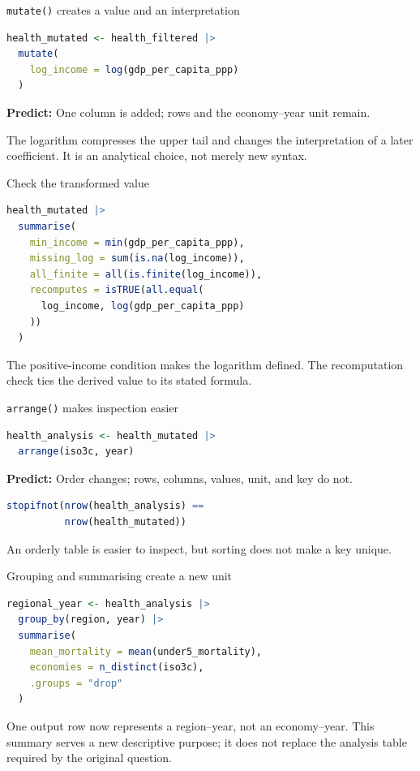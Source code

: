 \begin{frame}[fragile]{\texttt{mutate()} creates a value and an interpretation}
\begin{lstlisting}[language=R]
health_mutated <- health_filtered |>
  mutate(
    log_income = log(gdp_per_capita_ppp)
  )
\end{lstlisting}

  \textbf{Predict:} One column is added; rows and the economy--year unit remain.

  \vspace{0.5em}
  The logarithm compresses the upper tail and changes the interpretation of a
  later coefficient. It is an analytical choice, not merely new syntax.
\end{frame}

\begin{frame}[fragile]{Check the transformed value}
\begin{lstlisting}[language=R]
health_mutated |>
  summarise(
    min_income = min(gdp_per_capita_ppp),
    missing_log = sum(is.na(log_income)),
    all_finite = all(is.finite(log_income)),
    recomputes = isTRUE(all.equal(
      log_income, log(gdp_per_capita_ppp)
    ))
  )
\end{lstlisting}

  The positive-income condition makes the logarithm defined. The recomputation
  check ties the derived value to its stated formula.
\end{frame}

\begin{frame}[fragile]{\texttt{arrange()} makes inspection easier}
\begin{lstlisting}[language=R]
health_analysis <- health_mutated |>
  arrange(iso3c, year)
\end{lstlisting}

  \textbf{Predict:} Order changes; rows, columns, values, unit, and key do not.

\begin{lstlisting}[language=R]
stopifnot(nrow(health_analysis) ==
          nrow(health_mutated))
\end{lstlisting}

  An orderly table is easier to inspect, but sorting does not make a key unique.
\end{frame}

\begin{frame}[fragile]{Grouping and summarising create a new unit}
\begin{lstlisting}[language=R]
regional_year <- health_analysis |>
  group_by(region, year) |>
  summarise(
    mean_mortality = mean(under5_mortality),
    economies = n_distinct(iso3c),
    .groups = "drop"
  )
\end{lstlisting}

  One output row now represents a \alert{region--year}, not an economy--year.
  This summary serves a new descriptive purpose; it does not replace the
  analysis table required by the original question.
\end{frame}

